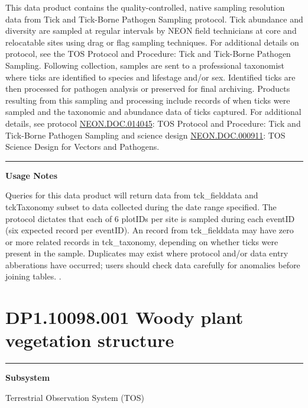\documentclass[]{article}
\begin{document}
This data product contains the quality-controlled, native sampling
resolution data from Tick and Tick-Borne Pathogen Sampling protocol.
Tick abundance and diversity are sampled at regular intervals by NEON
field technicians at core and relocatable sites using drag or flag
sampling techniques. For additional details on protocol, see the TOS
Protocol and Procedure: Tick and Tick-Borne Pathogen Sampling. Following
collection, samples are sent to a professional taxonomist where ticks
are identified to species and lifestage and/or sex. Identified ticks are
then processed for pathogen analysis or preserved for final archiving.
Products resulting from this sampling and processing include records of
when ticks were sampled and the taxonomic and abundance data of ticks
captured. For additional details, see protocol
\href{http://data.neonscience.org/api/v0/documents/NEON.DOC.014045vH}{NEON.DOC.014045}:
TOS Protocol and Procedure: Tick and Tick-Borne Pathogen Sampling and
science design
\href{http://data.neonscience.org/api/v0/documents/NEON.DOC.000911vA}{NEON.DOC.000911}:
TOS Science Design for Vectors and Pathogens.

\begin{center}\rule{0.5\linewidth}{\linethickness}\end{center}

\textbf{Usage Notes}

Queries for this data product will return data from tck\_fielddata and
tckTaxonomy subset to data collected during the date range specified.
The protocol dictates that each of 6 plotIDs per site is sampled during
each eventID (six expected record per eventID). An record from
tck\_fielddata may have zero or more related records in tck\_taxonomy,
depending on whether ticks were present in the sample. Duplicates may
exist where protocol and/or data entry abberations have occurred; users
should check data carefully for anomalies before joining tables.
\newpage
.

\section{DP1.10098.001 Woody plant vegetation
structure}\label{dp1.10098.001-woody-plant-vegetation-structure}

\begin{center}\rule{0.5\linewidth}{\linethickness}\end{center}

\textbf{Subsystem}

Terrestrial Observation System (TOS)
\end{document}
